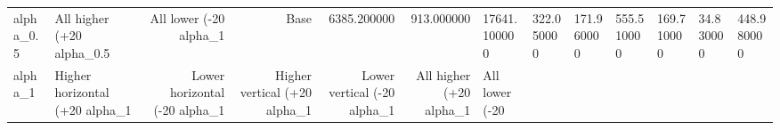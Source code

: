 \begin{tabular}{llrrrr}
alpha_0.5 & All higher (+20%
alpha_0.5 & All lower (-20%
alpha_1 & Base & 6385.200000 & 913.000000 & 17641.100000 & 322.050000 & 171.960000 & 555.510000 & 169.710000 & 34.830000 & 448.980000 \\
alpha_1 & Higher horizontal (+20%
alpha_1 & Lower horizontal (-20%
alpha_1 & Higher vertical (+20%
alpha_1 & Lower vertical (-20%
alpha_1 & All higher (+20%
alpha_1 & All lower (-20%
\bottomrule
\end{tabular}
